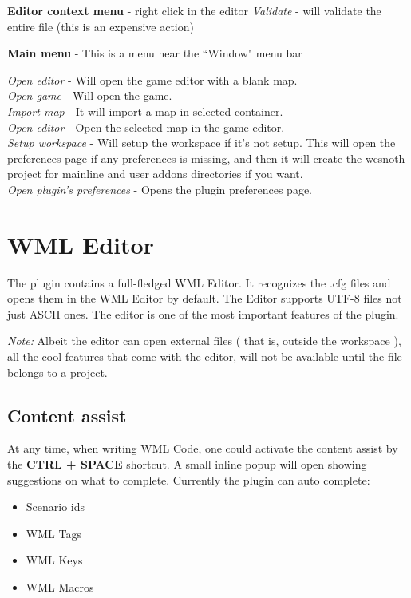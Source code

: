 \documentclass[10pt]{article}
\begin{document}
\begin{description}
\item{\textbf{Editor context menu}} - right click in the editor
   \textit{Validate} - will validate the entire file (this is an expensive action)

\item{\textbf{Main menu}} - This is a menu near the ``Window" menu bar

   \textit{Open editor} - Will open the game editor with a blank map.\\
   \textit{Open game} - Will open the game.\\
   \textit{Import map} - It will import a map in selected container.\\
   \textit{Open editor} - Open the selected map in the game editor.\\
   \textit{Setup workspace} - Will setup the workspace if it's not setup. This will open the preferences page if any preferences is missing, and then it will create the wesnoth project for mainline and user addons directories if you want.\\
   \textit{Open plugin's preferences} - Opens the plugin preferences page.\\
\end{description}

\section{WML Editor}
The plugin contains a full-fledged WML Editor. It recognizes the .cfg files and opens them in the WML Editor by default. The Editor supports UTF-8 files not just ASCII ones. The editor is one of the most important features of the plugin.

\textit{Note:} Albeit the editor can open external files ( that is, outside the workspace ), all the cool features that come with the editor, will not be available until the file belongs to a project.

\subsection{Content assist}
At any time, when writing WML Code, one could activate the content assist by the \textbf{CTRL + SPACE} shortcut. A small inline popup will open showing suggestions on what to complete. Currently the plugin can auto complete:
\begin{itemize}
  \item Scenario ids
  \item WML Tags
  \item WML Keys
  \item WML Macros
\end{itemize}
\end{document}
